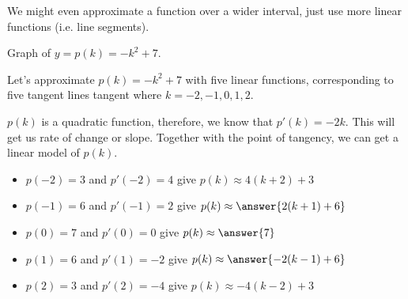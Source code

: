 \documentclass{ximera}
\begin{document}
We might even approximate a function over a wider interval, just use more linear functions (i.e. line segments).





Graph of $y = p(k) = -k^2 + 7$.




\begin{image}
\end{image}




Let's approximate $p(k) = -k^2+7$ with five linear functions, corresponding to five tangent lines tangent where $k=-2, -1, 0, 1, 2$.

$p(k)$ is a quadratic function, therefore, we know that $p'(k) = -2k$.  This will get us rate of change or slope.  Together with the point of tangency, we can get a linear model of $p(k)$.


\begin{model}

\begin{itemize}
\item $p(-2) = 3$ and $p'(-2) = 4$ give $p(k) \approx 4(k+2)+3$
\item $p(-1) = 6$ and $p'(-1) = 2$ give $p(k) \approx \answer{2(k+1)+6}$
\item $p(0) = 7$ and $p'(0) = 0$   give $p(k) \approx \answer{7}$
\item $p(1) = 6$ and $p'(1) = -2$   give  $ p(k) \approx \answer{-2(k-1)+6}$
\item $p(2) = 3$ and $p'(2) = -4$   give $p(k) \approx -4(k-2)+3$
\end{itemize}

\end{model}
\end{document}
